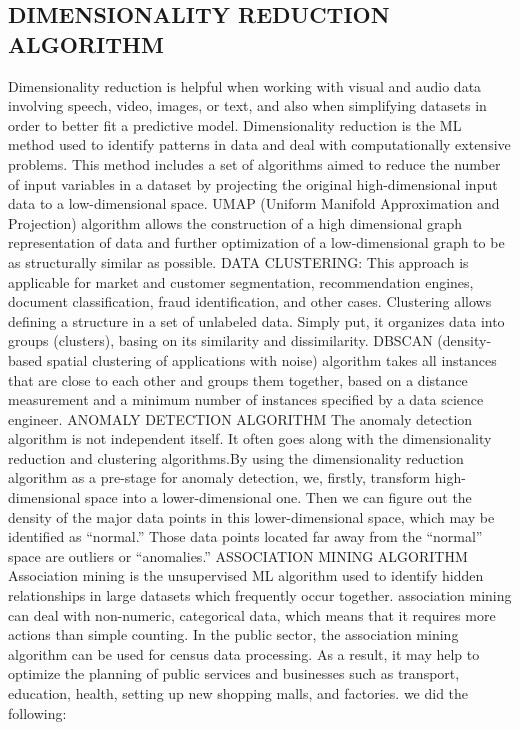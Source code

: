 \documentclass{article}
\begin{document}
\subsection{DIMENSIONALITY REDUCTION ALGORITHM} %
\label{sub:DIMENSIONALITY REDUCTION ALGORITHM}
Dimensionality reduction is helpful when working with visual and audio data involving speech, video, images, or text, and also when simplifying datasets in order to better fit a predictive model.
Dimensionality reduction is the ML method used to identify patterns in data and deal with computationally extensive problems. This method includes a set of algorithms aimed to reduce the number of input variables in a dataset by projecting the original high-dimensional input data to a low-dimensional space.
UMAP (Uniform Manifold Approximation and Projection) algorithm allows the construction of a high dimensional graph representation of data and further optimization of a low-dimensional graph to be as structurally similar as possible.
DATA CLUSTERING:
This approach is applicable for market and customer segmentation, recommendation engines, document classification, fraud identification, and other cases.
Clustering allows defining a structure in a set of unlabeled data. Simply put, it organizes data into groups (clusters), basing on its similarity and dissimilarity.
DBSCAN (density-based spatial clustering of applications with noise) algorithm takes all instances that are close to each other and groups them together, based on a distance measurement and a minimum number of instances specified by a data science engineer.
ANOMALY DETECTION ALGORITHM
The anomaly detection algorithm is not independent itself. It often goes along with the dimensionality reduction and clustering algorithms.By using the dimensionality reduction algorithm as a pre-stage for anomaly detection, we, firstly, transform high-dimensional space into a lower-dimensional one. Then we can figure out the density of the major data points in this lower-dimensional space, which may be identified as “normal.” Those data points located far away from the “normal” space are outliers or “anomalies.”
ASSOCIATION MINING ALGORITHM
Association mining is the unsupervised ML algorithm used to identify hidden relationships in large datasets which frequently occur together. association mining can deal with non-numeric, categorical data, which means that it requires more actions than simple counting.
In the public sector, the association mining algorithm can be used for census data processing. As a result, it may help to optimize the planning of public services and businesses such as transport, education, health, setting up new shopping malls, and factories.
we did the following:
\end{document}
